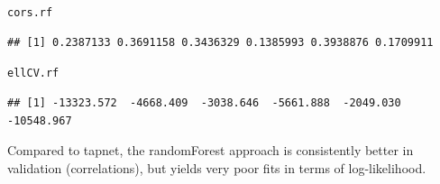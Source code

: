\documentclass[a4paper, 11pt]{article}\usepackage[]{graphicx}\usepackage[]{color}
\makeatletter
\newcommand{\hlstd}[1]{\textcolor[rgb]{0.345,0.345,0.345}{#1}}%
\newenvironment{kframe}{%
 \def\at@end@of@kframe{}%
 \ifinner\ifhmode%
  \def\at@end@of@kframe{\end{minipage}}%
  \begin{minipage}{\columnwidth}%
 \fi\fi%
 \def\FrameCommand##1{\hskip\@totalleftmargin \hskip-\fboxsep
 \colorbox{shadecolor}{##1}\hskip-\fboxsep
     \hskip-\linewidth \hskip-\@totalleftmargin \hskip\columnwidth}%
 \MakeFramed {\advance\hsize-\width
   \@totalleftmargin\z@ \linewidth\hsize
   \@setminipage}}%
 {\par\unskip\endMakeFramed%
 \at@end@of@kframe}
\newenvironment{knitrout}{}{} %
\makeatother
\begin{document}
\begin{knitrout}\small
{}\color{fgcolor}\begin{kframe}
\begin{alltt}
\hlstd{cors.rf}
\end{alltt}
\begin{verbatim}
## [1] 0.2387133 0.3691158 0.3436329 0.1385993 0.3938876 0.1709911
\end{verbatim}
\begin{alltt}
\hlstd{ellCV.rf}
\end{alltt}
\begin{verbatim}
## [1] -13323.572  -4668.409  -3038.646  -5661.888  -2049.030 -10548.967
\end{verbatim}
\end{kframe}
\end{knitrout}
Compared to tapnet, the randomForest approach is consistently better in validation (correlations), but yields very poor fits in terms of log-likelihood.
\end{document}
